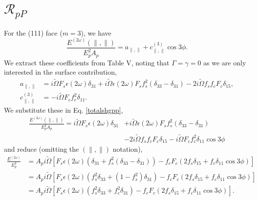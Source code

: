 \section{\texorpdfstring{$\mathcal{R}_{pP}$}{RpP}}

For the (111) face ($m = 3$), we have 
\begin{equation}\label{totalshgpp} %
\frac{E^{(2\omega)}(\parallel,\parallel)}{E^{2}_{p}A_{p}}
= a_{\parallel,\parallel} + c^{(3)}_{\parallel,\parallel}\cos3\phi.
\end{equation}
We extract these coefficients from Table V, noting that $\Gamma = \gamma = 0$
as we are only interested in the surface contribution,
\begin{align*}
a_{\parallel,\parallel}
&= i\tilde{\Omega}F_{s}\epsilon(2\omega)\delta_{31}
 + i\tilde{\Omega}\epsilon(2\omega)F_{s}f^{2}_{s}(\delta_{33} - \delta_{31})
 - 2i\tilde{\Omega}f_{s}f_{c}F_{c}\delta_{15},\\
c^{(3)}_{\parallel,\parallel} &= -i\tilde{\Omega}F_{c}f^{2}_{c}\delta_{11}.
\end{align*}
We substitute these in Eq. \eqref{totalshgpp},
\begin{equation*}
\begin{split}
\frac{E^{(2\omega)}(\parallel,\parallel)}{E^{2}_{p}A_{p}}
 = i\tilde{\Omega}F_{s}\epsilon(2\omega)\delta_{31} 
&+ i\tilde{\Omega}\epsilon(2\omega)F_{s}f^{2}_{s}(\delta_{33} - \delta_{31})\\ 
&- 2i\tilde{\Omega}f_{s}f_{c}F_{c}\delta_{15}
 - i\tilde{\Omega}F_{c}f^{2}_{c}\delta_{11}\cos3\phi
\end{split}
\end{equation*}
and reduce (omitting the $(\parallel,\parallel)$ notation),
\begin{equation*}
\begin{split}
\frac{E^{(2\omega)}}{E^{2}_{p}}
&= A_{p}i\tilde{\Omega}
   \left[
   F_{s}\epsilon(2\omega)(\delta_{31} + f^{2}_{s}(\delta_{33} - \delta_{31}))
    - f_{c}F_{c}(2f_{s}\delta_{15} + f_{c}\delta_{11}\cos3\phi)
   \right]\\
&= A_{p}i\tilde{\Omega}
   \left[
   F_{s}\epsilon(2\omega)(f^{2}_{s}\delta_{33} + (1 - f^{2}_{s})\delta_{31})
   - f_{c}F_{c}(2f_{s}\delta_{15} + f_{c}\delta_{11}\cos3\phi)
   \right]\\
&= A_{p}i\tilde{\Omega}
   \left[
   F_{s}\epsilon(2\omega)(f^{2}_{s}\delta_{33} + f^{2}_{c}\delta_{31}) 
   - f_{c}F_{c}(2f_{s}\delta_{15} + f_{c}\delta_{11}\cos3\phi)
   \right].
\end{split}
\end{equation*}
